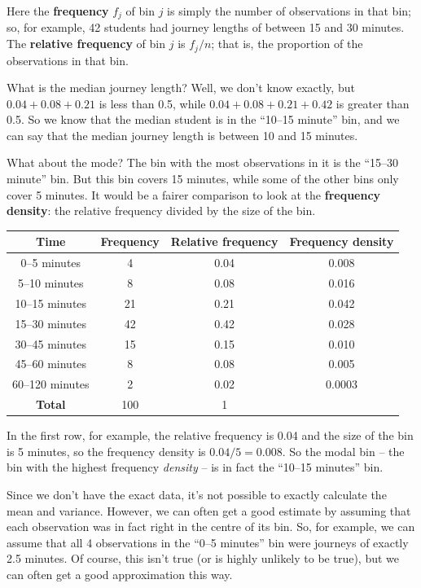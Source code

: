 \documentclass[
  a4paper,
]{book}
\theoremstyle{definition}
\theoremstyle{definition}
\theoremstyle{definition}
\theoremstyle{definition}
\theoremstyle{remark}
\begin{document}
Here the \textbf{frequency} \(f_j\) of bin \(j\) is simply the number of observations in that bin; so, for example, 42 students had journey lengths of between 15 and 30 minutes. The \textbf{relative frequency} of bin \(j\) is \(f_j/n\); that is, the proportion of the observations in that bin.

What is the median journey length? Well, we don't know exactly, but \(0.04 + 0.08 + 0.21\) is less than 0.5, while \(0.04 + 0.08 + 0.21 + 0.42\) is greater than 0.5. So we know that the median student is in the ``10--15 minute'' bin, and we can say that the median journey length is between 10 and 15 minutes.

What about the mode? The bin with the most observations in it is the ``15--30 minute'' bin. But this bin covers 15 minutes, while some of the other bins only cover 5 minutes. It would be a fairer comparison to look at the \textbf{frequency density}: the relative frequency divided by the size of the bin.

\begin{longtable}[]{@{}cccc@{}}
\toprule
Time & Frequency & Relative frequency & Frequency density \\
\midrule
\endhead
0--5 minutes & 4 & 0.04 & 0.008 \\
5--10 minutes & 8 & 0.08 & 0.016 \\
10--15 minutes & 21 & 0.21 & 0.042 \\
15--30 minutes & 42 & 0.42 & 0.028 \\
30--45 minutes & 15 & 0.15 & 0.010 \\
45--60 minutes & 8 & 0.08 & 0.005 \\
60--120 minutes & 2 & 0.02 & 0.0003 \\
\textbf{Total} & 100 & 1 & \\
\bottomrule
\end{longtable}

In the first row, for example, the relative frequency is 0.04 and the size of the bin is 5 minutes, so the frequency density is \(0.04/5 = 0.008\). So the modal bin -- the bin with the highest frequency \emph{density} -- is in fact the ``10--15 minutes'' bin.

Since we don't have the exact data, it's not possible to exactly calculate the mean and variance. However, we can often get a good estimate by assuming that each observation was in fact right in the centre of its bin. So, for example, we can assume that all 4 observations in the ``0--5 minutes'' bin were journeys of exactly 2.5 minutes. Of course, this isn't true (or is highly unlikely to be true), but we can often get a good approximation this way.
\end{document}
